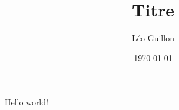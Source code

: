 \documentclass{atomathematyk}
\title{Titre}
\author{Léo Guillon}
\date{\today}
\begin{document}
Hello world!
\end{document}
